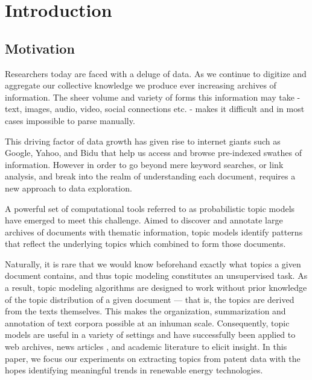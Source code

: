 
\chapter{Introduction} %

\label{Chapter1} %

\newcommand{\keyword}[1]{\textbf{#1}}
\newcommand{\tabhead}[1]{\textbf{#1}}
\newcommand{\code}[1]{\texttt{#1}}
\newcommand{\file}[1]{\texttt{\bfseries#1}}
\newcommand{\option}[1]{\texttt{\itshape#1}}


\section{Motivation}
Researchers today are faced with a deluge of data. As we continue to digitize and aggregate our collective knowledge we produce ever increasing archives of information. The sheer volume and variety of forms this information may take - text, images, audio, video, social connections etc. - makes it difficult and in most cases impossible to parse manually. 

This driving factor of data growth has given rise to internet giants such as Google, Yahoo, and Bidu that help us access and browse pre-indexed swathes of information. However in order to go beyond mere keyword searches, or link analysis, and break into the realm of understanding each document, requires a new approach to data exploration.

A powerful set of computational tools referred to as probabilistic topic models have emerged to meet this challenge. Aimed to discover and annotate large archives of documents with thematic information, topic models identify patterns that reflect the underlying topics which combined to form those documents.

Naturally, it is rare that we would know beforehand exactly what topics a given document contains, and thus topic modeling constitutes an unsupervised task. As a result, topic modeling algorithms are designed to work without prior knowledge of the topic distribution of a given document — that is, the topics are derived from the texts themselves. This makes the organization, summarization and annotation of text corpora possible at an inhuman scale. Consequently, topic models are useful in a variety of settings and have successfully been applied to web archives, news articles \parencite{Newman:2006:AET:2106961.2106971}, and academic literature \parencite{Steyvers:2004:PAM:1014052.1014087} to elicit insight. In this paper, we focus our experiments on extracting topics from patent data with the hopes identifying meaningful trends in renewable energy technologies. 

